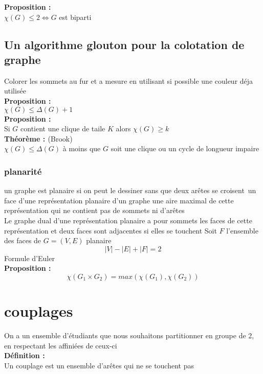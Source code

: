 \documentclass{report}
\newcommand{\deffinition}{\textcolor[rgb]{0.65,0,0.7}{Définition : }}
\newcommand{\Def}{\textbf{\deffinition}}
\newcommand{\propo}{\textcolor[rgb]{0,0,0.75}{Proposition : }}
\newcommand{\Propo}{\textbf{\propo}}
\newcommand{\thm}{\textcolor[rgb]{0,0.4,1}{Théorème : }}
\newcommand{\THM}{\textbf{\thm}}
\begin{document}
\Propo\\
$\chi(G) \leq 2 \Leftrightarrow G$ est biparti\\

\subsection{Un algorithme glouton pour la colotation de graphe}
Colorer les sommets au fur et a mesure en utilisant si possible une couleur déja utilisée\\

\Propo\\
$\chi(G) \leq \Delta(G)+1$\\

\Propo\\
Si $G$ contient une clique de taile $K$ alors $\chi(G) \geq k $\\

\THM (Brook)\\
$\chi(G) \leq \Delta(G)$ à moins que $G$ soit une clique ou un cycle de longueur impaire\\

\subsubsection{planarité}
un graphe est planaire si on peut le dessiner sans que deux arêtes se croisent\
un face d'une représentation planaire d'un graphe une aire maximal de cette représentation qui ne contient pas de sommets ni d'arêtes\\
Le graphe dual d'une représentation planaire a pour sommets les faces de cette représentation et deux faces sont adjacentes si elles se touchent
Soit $F$ l'ensemble des faces de $G=(V,E)$ planaire\\

$$\left|V\right|-\left|E\right|+\left|F\right|=2$$
Formule d'Euler\\

\Propo\\
$$\chi \left(G_1\times G_2\right)=max\left(\chi\left(G_1\right),\chi\left(G_2\right)\right)$$


\section{couplages}
On a un ensemble d'étudiants que nous souhaitons partitionner en groupe de 2, en respectant les affiniées de ceux-ci\\

\Def\\
Un couplage est un ensemble d'arêtes qui ne se touchent pas\\
\end{document}
